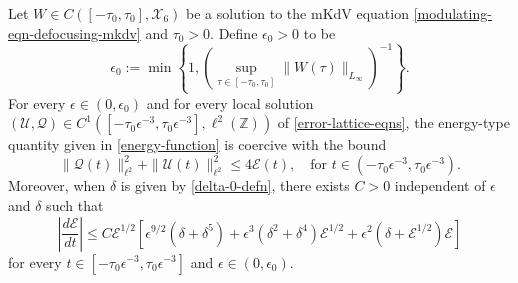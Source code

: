 \begin{lem}
	Let \(W\in C([-\tau_0,\tau_0],\mathcal X_6)\) be a solution to the mKdV equation \cref{modulating-eqn-defocusing-mkdv} and \(\tau_0 > 0\). Define \(\epsilon_0>0\) to be
	\begin{equation}\label{epsilon-0-defn}
		\epsilon_0 := \min\left\{1, \left( \sup_{\tau\in[-\tau_0, \tau_0]} \|W(\tau)\|_{L_\infty}\right)^{-1} \right\}.
	\end{equation}
	For every \(\epsilon \in (0,\epsilon_0)\) and for every local solution \((\mathcal U, \mathcal Q) \in C^1([-\tau_0\epsilon^{-3}, \tau_0\epsilon^{-3}], \ell^2(\mathbb Z))\) of \cref{error-lattice-eqns}, the energy-type quantity given in \cref{energy-function} is coercive with the bound
	\begin{equation}\label{coercive-bound}
		\|\mathcal Q(t) \|_{\ell^2}^2 + \| \mathcal U (t) \|_{\ell^2}^2 \leq  4 \mathcal E(t), \quad \text{for } t\in(-\tau_0\epsilon^{-3}, \tau_0\epsilon^{-3}).
	\end{equation}
	Moreover, when \(\delta\) is given by \cref{delta-0-defn}, there exists \(C> 0\) independent of \(\epsilon\) and \(\delta\) such that 
	\begin{equation}
		\left|\frac{d\mathcal E}{dt} \right| \leq C \mathcal E^{1/2}\left[ \epsilon^{9/2} (\delta + \delta^5)  + \epsilon^3(\delta^2 + \delta^4) \mathcal E^{1/2} + \epsilon^2(\delta + \mathcal{E}^{1/2})\mathcal E\right]
	\end{equation}
	for every \(t\in [-\tau_0\epsilon^{-3}, \tau_0\epsilon^{-3}]\) and \(\epsilon \in (0,\epsilon_0)\).
\end{lem}
